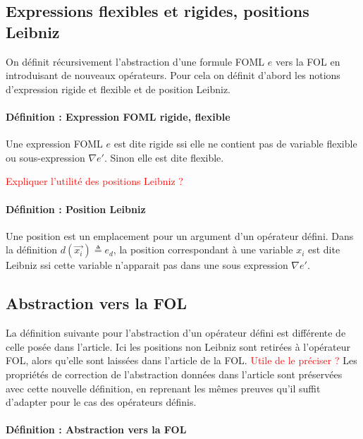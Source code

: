 \documentclass[12pt]{article}
\newcommand{\raph}[1]{\textcolor{red}{#1}}
\begin{document}
\subsection{Expressions flexibles et rigides, positions Leibniz}

On définit récursivement l'abstraction d'une formule FOML $e$ vers la FOL en introduisant de nouveaux opérateurs.
Pour cela on définit d'abord les notions d'expression rigide et flexible et de position Leibniz.

\paragraph{Définition : Expression FOML rigide, flexible}
Une expression FOML $e$ est dite rigide ssi elle ne contient pas de variable flexible ou sous-expression $\nabla e'$.
Sinon elle est dite flexible.

\raph{Expliquer l'utilité des positions Leibniz ?}

\paragraph{Définition : Position Leibniz}
Une position est un emplacement pour un argument d'un opérateur défini.
Dans la définition $d(\vec{x_i}) \triangleq e_d$, la position correspondant à une variable $x_i$ est dite Leibniz ssi cette variable n'apparait pas dans une sous expression $\nabla e'$.


\subsection{Abstraction vers la FOL}

La définition suivante pour l'abstraction d'un opérateur défini est différente de celle posée dans l'article.
Ici les positions non Leibniz sont retirées à l'opérateur FOL, alors qu'elle sont laissées dans l'article de la FOL.
\raph{Utile de le préciser ?}
Les propriétés de correction de l'abstraction données dans l'article sont préservées avec cette nouvelle définition, en reprenant les mêmes preuves qu'il suffit d'adapter pour le cas des opérateurs définis.

\paragraph{Définition : Abstraction vers la FOL}
\end{document}
